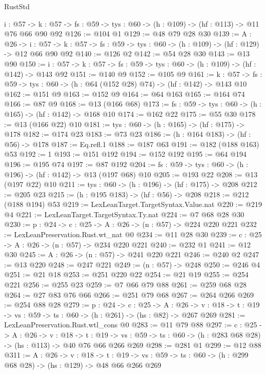 \begin{lexlean}{RustStd}
\begin{coremodule}
{\begin{coremodule}
{{{{  {i : @57} ->
  {k : @57} -> {fs : @59} -> {tys : @60} -> (h : @109) -> (hf : @113) -> @11 @76 @66 @90 @92
@126 := @104 @1
@129 := @48 @79 @28 @30
@139 := {A : @26} ->
  {i : @57} ->
  {k : @57} -> {fs : @59} -> {tys : @60} -> (h : @109) -> (hf : @129) -> @12 @66 @90 @92
@140 := @126 @2
@142 := @54 @28 @30
@143 := @13 @90
@150 := {i : @57} -> {k : @57} -> {fs : @59} -> {tys : @60} -> (h : @109) -> (hf : @142) -> @143 @92
@151 := @140 @9
@152 := @105 @9
@161 := {k : @57} ->
  {fs : @59} -> {tys : @60} -> (h : @64 (@152 @28) @74) -> (hf : @142) -> @143 @10
@162 := @151 @9
@163 := @152 @9
@164 := @64 @163
@165 := @164 @74
@166 := @87 @9
@168 := @13 (@166 @68)
@173 := {fs : @59} -> {tys : @60} -> (h : @165) -> (hf : @142) -> @168 @10
@174 := @162 @22
@175 := @55 @30
@178 := @13 (@166 @22) @10
@181 := {tys : @60} -> (h : @165) -> (hf : @175) -> @178
@182 := @174 @23
@183 := @73 @23
@186 := (h : @164 @183) -> (hf : @56) -> @178
@187 := Eq.refl.{1}
@188 := @187 @63
@191 := @182 (@188 @163) @53
@192 := 1
@193 := @151 @192
@194 := @152 @192
@195 := @64 @194
@196 := @195 @74
@197 := @87 @192
@204 := {fs : @59} -> {tys : @60} -> (h : @196) -> (hf : @142) -> @13 (@197 @68) @10
@205 := @193 @22
@208 := @13 (@197 @22) @10
@211 := {tys : @60} -> (h : @196) -> (hf : @175) -> @208
@212 := @205 @23
@215 := (h : @195 @183) -> (hf : @56) -> @208
@218 := @212 (@188 @194) @53
@219 := LexLeanTarget.TargetSyntax.Value.nat
@220 := @219 @4
@221 := LexLeanTarget.TargetSyntax.Ty.nat
@224 := @7 @68 @28 @30
@230 := {p : @24} -> {c : @25} -> {A : @26} -> (n : @57) -> @224 @220 @221
@232 := LexLeanPreservation.Rust.wt_nat @0
@234 := @11 @28 @30
@239 := {c : @25} -> {A : @26} -> (n : @57) -> @234 @220 @221
@240 := @232 @1
@241 := @12 @30
@245 := {A : @26} -> (n : @57) -> @241 @220 @221
@246 := @240 @2
@247 := @13 @220
@248 := @247 @221
@249 := (n : @57) -> @248
@250 := @246 @4
@251 := @21 @18
@253 := @251 @220 @22
@254 := @21 @19
@255 := @254 @221
@256 := @255 @23
@259 := @7 @66 @79 @88
@261 := @259 @68 @28
@264 := @27 @83 @76 @66
@266 := @251 @79 @68
@267 := @264 @266
@269 := @254 @88 @28
@279 := {p : @24} ->
  {c : @25} ->
  {A : @26} ->
  {v : @18} -> {t : @19} -> {vs : @59} -> {ts : @60} -> (h : @261) -> (hs : @82) -> @267 @269
@281 := LexLeanPreservation.Rust.wtl_cons @0
@283 := @11 @79 @88
@297 := {c : @25} ->
  {A : @26} ->
  {v : @18} ->
  {t : @19} ->
  {vs : @59} -> {ts : @60} -> (h : @283 @68 @28) -> (hs : @113) -> @40 @76 @66 @266 @269
@298 := @281 @1
@299 := @12 @88
@311 := {A : @26} ->
  {v : @18} ->
  {t : @19} -> {vs : @59} -> {ts : @60} -> (h : @299 @68 @28) -> (hs : @129) -> @48 @66 @266 @269
}}}}
\end{coremodule}}
\end{coremodule}
\end{lexlean}
